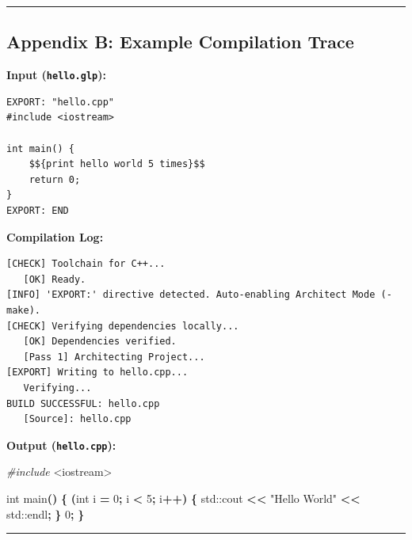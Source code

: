 \documentclass[11pt, a4paper]{article}
\newenvironment{Shaded}{\begin{snugshade}}{\end{snugshade}}
\newcommand{\BuiltInTok}[1]{#1}
\newcommand{\DataTypeTok}[1]{\textcolor[rgb]{0.13,0.29,0.53}{#1}}
\newcommand{\DecValTok}[1]{\textcolor[rgb]{0.00,0.00,0.81}{#1}}
\newcommand{\ImportTok}[1]{#1}
\newcommand{\NormalTok}[1]{#1}
\newcommand{\OperatorTok}[1]{\textcolor[rgb]{0.81,0.36,0.00}{\textbf{#1}}}
\newcommand{\PreprocessorTok}[1]{\textcolor[rgb]{0.56,0.35,0.01}{\textit{#1}}}
\newcommand{\StringTok}[1]{\textcolor[rgb]{0.31,0.60,0.02}{#1}}
\begin{document}
\begin{center}\rule{0.5\linewidth}{0.5pt}\end{center}

\subsection{Appendix B: Example Compilation
Trace}\label{appendix-b-example-compilation-trace}

\textbf{Input (\texttt{hello.glp}):}

\begin{verbatim}
EXPORT: "hello.cpp"
#include <iostream>

int main() {
    $${print hello world 5 times}$$
    return 0;
}
EXPORT: END
\end{verbatim}

\textbf{Compilation Log:}

\begin{verbatim}
[CHECK] Toolchain for C++...
   [OK] Ready.
[INFO] 'EXPORT:' directive detected. Auto-enabling Architect Mode (-make).
[CHECK] Verifying dependencies locally...
   [OK] Dependencies verified.
   [Pass 1] Architecting Project...
[EXPORT] Writing to hello.cpp...
   Verifying...
BUILD SUCCESSFUL: hello.cpp
   [Source]: hello.cpp
\end{verbatim}

\textbf{Output (\texttt{hello.cpp}):}

\begin{Shaded}
\begin{Highlighting}[]
\PreprocessorTok{\#include }\ImportTok{\textless{}iostream\textgreater{}}

\DataTypeTok{int}\NormalTok{ main}\OperatorTok{()} \OperatorTok{\{}
    \OperatorTok{(}\DataTypeTok{int}\NormalTok{ i }\OperatorTok{=} \DecValTok{0}\OperatorTok{;}\NormalTok{ i }\OperatorTok{\textless{}} \DecValTok{5}\OperatorTok{;}\NormalTok{ i}\OperatorTok{++)} \OperatorTok{\{}
        \BuiltInTok{std::}\NormalTok{cout }\OperatorTok{\textless{}\textless{}} \StringTok{"Hello World"} \OperatorTok{\textless{}\textless{}} \BuiltInTok{std::}\NormalTok{endl}\OperatorTok{;}
    \OperatorTok{\}}
     \DecValTok{0}\OperatorTok{;}
\OperatorTok{\}}
\end{Highlighting}
\end{Shaded}

\begin{center}\rule{0.5\linewidth}{0.5pt}\end{center}
\end{document}
